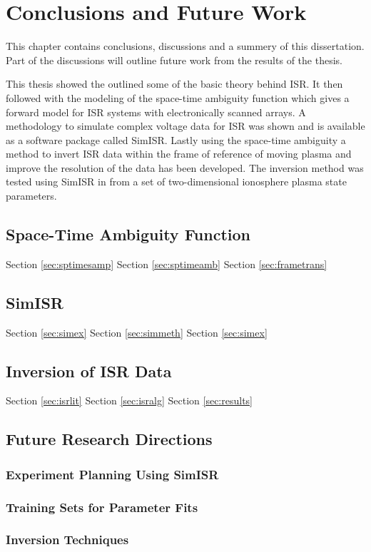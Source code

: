 \chapter{Conclusions and Future Work}
\label{chapter:Conclusions}
\thispagestyle{myheadings}

\graphicspath{{6_Conclusion/Figures/}}
This chapter contains conclusions, discussions and a summery of this dissertation. Part of the discussions will outline future work from the results of the thesis.

This thesis showed the outlined some of the basic theory behind ISR. It then followed with the modeling of the space-time ambiguity function which gives a forward model for ISR systems with electronically scanned arrays. A methodology to simulate complex voltage data for ISR was shown and is available as a software package called SimISR. Lastly using the space-time ambiguity a method to invert ISR data within the frame of reference of moving plasma and improve the resolution of the data has been developed. The inversion method was tested using SimISR in from a set of two-dimensional ionosphere plasma state parameters.

\section{Space-Time Ambiguity Function}
Section \ref{sec:sptimesamp} Section \ref{sec:sptimeamb} Section \ref{sec:frametrans} 
\section{SimISR}
Section \ref{sec:simex} Section \ref{sec:simmeth} Section \ref{sec:simex}
\section{Inversion of ISR Data}
Section \ref{sec:isrlit} Section \ref{sec:isralg} Section \ref{sec:results}
\section{Future Research Directions}

\subsection{Experiment Planning Using SimISR}

\subsection{Training Sets for Parameter Fits}

\subsection{Inversion Techniques}
